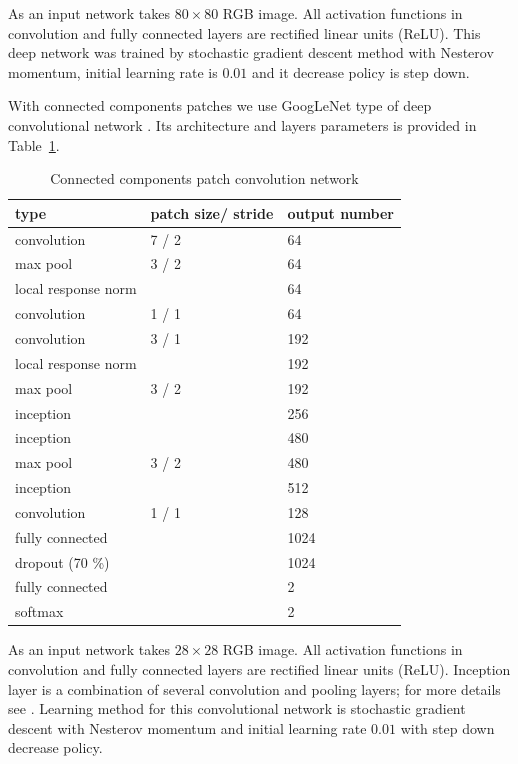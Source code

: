 \documentclass[conference,a4paper,twocolumn]{IEEEtran}
\begin{document}
As an input network takes $80\times80$ RGB image. All activation functions in convolution and fully connected layers are rectified linear units (ReLU). This deep network was trained by stochastic gradient descent method with Nesterov momentum, initial learning rate is $0.01$ and it decrease policy is step down.

With connected components patches we use GoogLeNet type of deep convolutional network \cite{Googlenet}. Its architecture and layers parameters is provided in Table~\ref{googlenet_tab}.
\begin{table}[!t]
\centering
\caption{Connected components patch convolution network}
\label{googlenet_tab}
\begin{tabular}{|l|p{1.3cm}|p{1.3cm}|}
\hline
\textbf{type} & \textbf{patch size/ stride} & \textbf{output number}  \\
\hline
convolution & 7 / 2 & 64 \\
\hline
max pool & 3 / 2 & 64 \\
\hline
local response norm & & 64 \\
\hline
convolution & 1 / 1 & 64 \\
\hline
convolution & 3 / 1 & 192 \\
\hline
local response norm & & 192 \\
\hline
max pool & 3 / 2 & 192 \\
\hline
inception &  & 256 \\
\hline
inception &  & 480 \\
\hline
max pool & 3 / 2 & 480 \\
\hline
inception &  & 512 \\
\hline
convolution & 1 / 1 & 128 \\
\hline
fully connected & & 1024 \\
\hline
dropout (70 \%) & & 1024 \\
\hline
fully connected & & 2 \\
\hline
softmax & & 2 \\
\hline
\end{tabular}
\end{table}

As an input network takes $28\times28$ RGB image. All activation functions in convolution and fully connected layers are rectified linear units (ReLU). Inception layer is a combination of several convolution and pooling layers; for more details see \cite{Googlenet}. Learning method for this convolutional network is stochastic gradient descent with Nesterov momentum and initial learning rate $0.01$ with step down decrease policy. 
\end{document}
